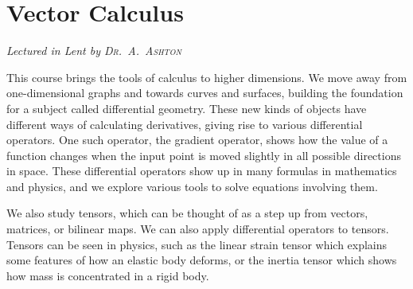 \chapter[Vector Calculus \\ \textnormal{\emph{Lectured in Lent \oldstylenums{2021} by \textsc{Dr.\ A.\ Ashton}}}]{Vector Calculus}
\emph{\Large Lectured in Lent  by \textsc{Dr.\ A.\ Ashton}}

This course brings the tools of calculus to higher dimensions.
We move away from one-dimensional graphs and towards curves and surfaces, building the foundation for a subject called differential geometry.
These new kinds of objects have different ways of calculating derivatives, giving rise to various differential operators.
One such operator, the gradient operator, shows how the value of a function changes when the input point is moved slightly in all possible directions in space.
These differential operators show up in many formulas in mathematics and physics, and we explore various tools to solve equations involving them.

We also study tensors, which can be thought of as a step up from vectors, matrices, or bilinear maps.
We can also apply differential operators to tensors.
Tensors can be seen in physics, such as the linear strain tensor which explains some features of how an elastic body deforms, or the inertia tensor which shows how mass is concentrated in a rigid body.



